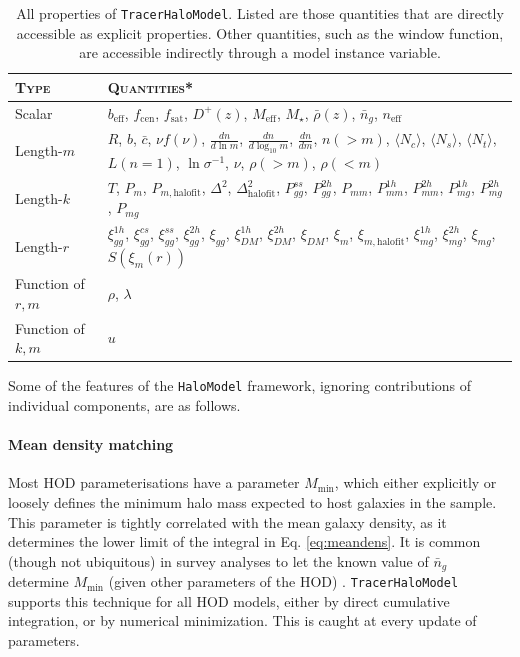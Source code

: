 \documentclass[5p]{elsarticle}
\newcommand{\Nc}{\langle N_c \rangle}
\newcommand{\Ns}{\langle N_s \rangle}
\newcommand{\Nt}{\langle N_t \rangle}
\begin{document}
\begin{table}
\centering
 {\tabulinesep=1mm
\begin{tabu} to \linewidth{X[1l]X[4.5l]} 
\toprule[0.05cm]
\textsc{Type} & \textsc{Quantities}*  \\
\toprule[0.05cm]
Scalar & $b_\text{eff}$, $f_\text{cen}$, $f_\text{sat}$, $D^+(z)$, $M_\text{eff}$, $M_\star$, $\bar{\rho}(z)$, $\bar{n}_g$, $n_\text{eff}$ \\
Length-$m$ & $R$, $b$, $\bar{c}$, $\nu f(\nu)$, $\frac{dn}{d\ln m}$, $\frac{dn}{d\log_{10} m}$, $\frac{dn}{d m}$, $n(>m)$, $\Nc$, $\Ns$, $\Nt$, $L(n=1)$, $\ln \sigma^{-1}$, $\nu$,  $\rho(>m)$, $\rho(<m)$ \\
Length-$k$ & $T$, $P_m$, $P_{m, \text{halofit}}$, $\Delta^2$, $\Delta^2_\text{halofit}$, $P_{gg}^{ss}$, $P_{gg}^{2h}$, $P_{mm}$, $P_{mm}^{1h}$, $P_{mm}^{2h}$, $P_{mg}^{1h}$, $P_{mg}^{2h}$, $P_{mg}$ \\
Length-$r$ & $\xi_{gg}^{1h}$, $\xi_{gg}^{cs}$, $\xi_{gg}^{ss}$, $\xi_{gg}^{2h}$, $\xi_{gg}$, $\xi_{DM}^{1h}$, $\xi_{DM}^{2h}$, $\xi_{DM}$, $\xi_m$, $\xi_{m, \text{halofit}}$, $\xi_{mg}^{1h}$, $\xi_{mg}^{2h}$, $\xi_{mg}$, $S(\xi_m(r))$ \\
Function of $r,m$ & $\rho$, $\lambda$ \\
Function of $k,m$ & $u$ \\
 
\bottomrule[0.05cm]
\end{tabu}}
\caption[All included properties of \texttt{TracerHaloModel}]{All properties of \texttt{TracerHaloModel}. Listed are those quantities that are directly accessible as explicit properties. Other quantities, such as the window function, are accessible indirectly through a model instance variable.}
\label{tab:halomodel_properties}
\end{table}


Some of the features of the \verb|HaloModel| framework, ignoring contributions of individual components, are as follows.

\paragraph*{Mean density matching} 
Most HOD parameterisations have a parameter $M_\text{min}$, which either explicitly or loosely defines the minimum halo mass expected to host galaxies in the sample. This parameter is tightly correlated with the mean galaxy density, as it determines the lower limit of the integral in Eq. \ref{eq:meandens}. It is common (though not ubiquitous) in survey analyses to let the known value of $\bar{n}_g$ determine $M_\text{min}$ (given other parameters of the HOD) \citep[eg][]{Beutler2013}. \verb|TracerHaloModel| supports this technique for all HOD models, either by direct cumulative integration, or by numerical minimization. This is caught at every update of parameters.
\end{document}
